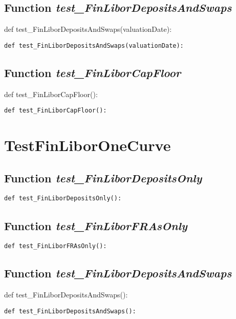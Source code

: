 \documentclass[twoside,11pt]{book}
\begin{document}
\subsection{Function {\it test\_FinLiborDepositsAndSwaps}}
def test\_FinLiborDepositsAndSwaps(valuationDate):

\begin{lstlisting}
def test_FinLiborDepositsAndSwaps(valuationDate):
\end{lstlisting}

\subsection{Function {\it test\_FinLiborCapFloor}}
def test\_FinLiborCapFloor():       

\begin{lstlisting}
def test_FinLiborCapFloor():       
\end{lstlisting}


\newpage
\section{TestFinLiborOneCurve}

\subsection{Function {\it test\_FinLiborDepositsOnly}}


\begin{lstlisting}
def test_FinLiborDepositsOnly():
\end{lstlisting}

\subsection{Function {\it test\_FinLiborFRAsOnly}}


\begin{lstlisting}
def test_FinLiborFRAsOnly():
\end{lstlisting}

\subsection{Function {\it test\_FinLiborDepositsAndSwaps}}
def test\_FinLiborDepositsAndSwaps():

\begin{lstlisting}
def test_FinLiborDepositsAndSwaps():
\end{lstlisting}
\end{document}
